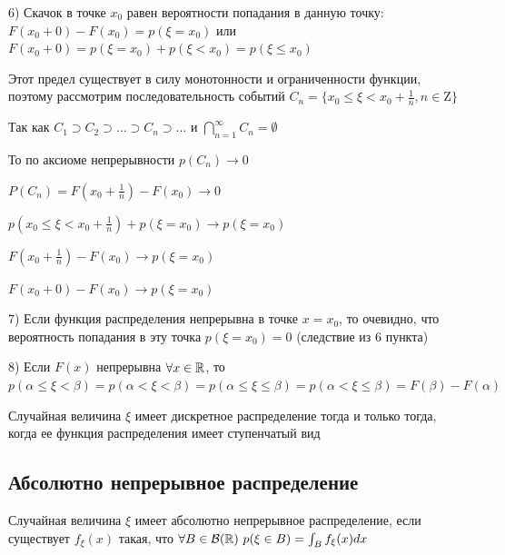 \documentclass[12pt]{article}
\begin{document}
    6) Скачок в точке $x_0$ равен вероятности попадания в данную точку: $F(x_0 + 0) - F(x_0) = p(\xi = x_0)$ или $F(x_0 + 0) = p(\xi = x_0) + p(\xi < x_0) = p(\xi \leq x_0)$

    
    \begin{MyProof}
        Этот предел существует в силу монотонности и ограниченности функции, поэтому рассмотрим последовательность событий $C_n = \{x_0 \leq \xi < x_0 + \frac{1}{n}, n \in \mathrm{Z}\}$

        Так как $C_1 \supset C_2 \supset \dots \supset C_n \supset \dots$ и $\bigcap_{n = 1}^\infty C_n = \emptyset$

        То по аксиоме непрерывности $p(C_n) \to 0$

        $P(C_n) = F(x_0 + \frac{1}{n}) - F(x_0) \rightarrow 0$

        $p(x_0 \leq \xi < x_0 + \frac{1}{n}) + p(\xi = x_0) \rightarrow p(\xi = x_0)$

        $F(x_0 + \frac{1}{n}) - F(x_0) \to p(\xi = x_0)$

        $F(x_0 + 0) - F(x_0) \to p(\xi = x_0)$
    \end{MyProof}
    
    7) Если функция распределения непрерывна в точке $x = x_0$, то очевидно, что вероятность попадания в эту точка $p(\xi = x_0) = 0$ (следствие из 6 пункта)
    
    8) Если $F(x)$ непрерывна $\forall x \in \mathbb{R}$, то $p(\alpha \leq \xi < \beta) = p(\alpha < \xi < \beta) = p(\alpha \leq \xi \leq \beta) = p(\alpha < \xi \leq \beta) = F(\beta) - F(\alpha)$
    
    \begin{MyTheorem}
        \Ths Случайная величина $\xi$ имеет дискретное распределение тогда и только тогда, когда ее функция распределения имеет ступенчатый вид
    \end{MyTheorem}

    \hypertarget{continuousdistributionproperties}{}

    \subsection{Абсолютно непрерывное распределение}

    \Def Случайная величина $\xi$ имеет абсолютно непрерывное распределение, если существует $f_\xi(x)$ такая, что $\forall B \in \mathcal{B}(\mathbb{R})
    \ p(\xi \in B) = \int_B f_\xi(x)dx$

    \hypertarget{densityfunctiondefinition}{}
\end{document}
